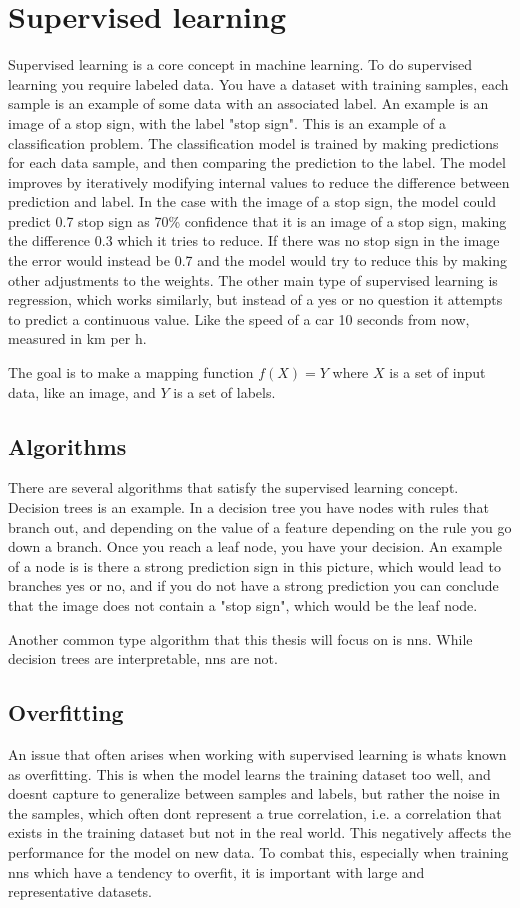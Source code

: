 \documentclass[UKenglish]{uiomasterthesis}
\begin{document}
\section{Supervised learning}
Supervised learning is a core concept in machine learning. To do supervised learning you require labeled data. You have a dataset with training samples, each sample is an example of some data with an associated label. An example is an image of a stop sign, with the label "stop sign". This is an example of a classification problem. The classification model is trained by making predictions for each data sample, and then comparing the prediction to the label. The model improves by iteratively modifying internal values to reduce the difference between prediction and label. In the case with the image of a stop sign, the model could predict 0.7 stop sign as 70\% confidence that it is an image of a stop sign, making the difference 0.3 which it tries to reduce. If there was no stop sign in the image the error would instead be 0.7 and the model would try to reduce this by making other adjustments to the weights. The other main type of supervised learning is regression, which works similarly, but instead of a yes or no question it attempts to predict a continuous value. Like the speed of a car 10 seconds from now, measured in km per h.

The goal is to make a mapping function $f(X)=Y$ where $X$ is a set of input data, like an image, and $Y$ is a set of labels.

\subsection{Algorithms}
There are several algorithms that satisfy the supervised learning concept. Decision trees is an example. In a decision tree you have nodes with rules that branch out, and depending on the value of a feature depending on the rule you go down a branch. Once you reach a leaf node, you have your decision. An example of a node is is there a strong prediction sign in this picture, which would lead to branches yes or no, and if you do not have a strong prediction you can conclude that the image does not contain a "stop sign", which would be the leaf node.

Another common type algorithm that this thesis will focus on is \acp{nn}. While decision trees are interpretable, \acp{nn} are not.

\subsection{Overfitting}
An issue that often arises when working with supervised learning is whats known as overfitting. This is when the model learns the training dataset too well, and doesnt capture to generalize between samples and labels, but rather the noise in the samples, which often dont represent a true correlation, i.e. a correlation that exists in the training dataset but not in the real world. This negatively affects the performance for the model on new data. To combat this, especially when training \acp{nn} which have a tendency to overfit, it is important with large and representative datasets.
\end{document}
